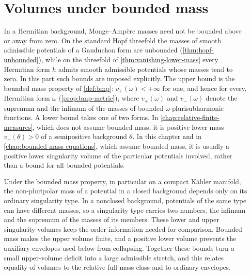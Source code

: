 \chapter{Volumes under bounded mass}
\label{chap:mass-bound-volumes}

\begingroup
{}

In a Hermitian background, Monge--Amp\`ere masses need not be bounded above or away from zero. On the standard Hopf threefold the masses of smooth admissible potentials of a Gauduchon form are unbounded (\cref{thm:hopf-unbounded}), while on the threefold of \cref{thm:vanishing-lower-mass} every Hermitian form $h$ admits smooth admissible potentials whose masses tend to zero. In this part such bounds are imposed explicitly. The upper bound is the bounded mass property of \cref{def:bmp}: $v_+(\omega)<+\infty$ for one, and hence for every, Hermitian form $\omega$ (\cref{prop:bmp-metric}), where $v_+(\omega)$ and $v_-(\omega)$ denote the supremum and the infimum of the masses of bounded $\omega$-plurisubharmonic functions. A lower bound takes one of two forms. In \cref{chap:relative-finite-measures}, which does not assume bounded mass, it is positive lower mass $v_-(\theta)>0$ of a semipositive background $\theta$. In this chapter and in \cref{chap:bounded-mass-equations}, which assume bounded mass, it is usually a positive lower singularity volume of the particular potentials involved, rather than a bound for all bounded potentials.

Under the bounded mass property, in particular on a compact K\"ahler manifold, the non-pluripolar mass of a potential in a closed background depends only on its ordinary singularity type. In a nonclosed background, potentials of the same type can have different masses, so a singularity type carries two numbers, the infimum and the supremum of the masses of its members. These lower and upper singularity volumes keep the order information needed for comparison. Bounded mass makes the upper volume finite, and a positive lower volume prevents the auxiliary envelopes used below from collapsing. Together these bounds turn a small upper-volume deficit into a large admissible stretch, and this relates equality of volumes to the relative full-mass class and to ordinary envelopes.

